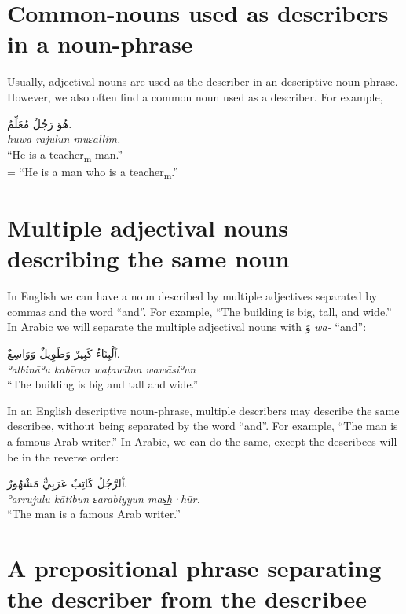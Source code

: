 \documentclass[
  10pt,
]{book}
\begin{document}
\section{Common-nouns used as describers in a noun-phrase}\label{common-nouns-used-as-describers-in-a-noun-phrase}

Usually, adjectival nouns are used as the describer in an descriptive noun-phrase. However, we also often find a common noun used as a describer. For example,

\foreignlanguage{arabic}{هُوَ رَجُلٌ مُعَلِّمٌ.}\\
\emph{huwa rajulun muɛallim.}\\
\enquote{He is a teacher\textsubscript{m} man.}\\
= \enquote{He is a man who is a teacher\textsubscript{m}.}

\section{Multiple adjectival nouns describing the same noun}\label{multiple-adjectival-nouns-describing-the-same-noun}

In English we can have a noun described by multiple adjectives separated by commas and the word \enquote{and}. For example, \enquote{The building is big, tall, and wide.} In Arabic we will separate the multiple adjectival nouns with \foreignlanguage{arabic}{وَ} \emph{wa-} \enquote{and}:

\foreignlanguage{arabic}{ٱَلْبِنَاءُ کَبِيرٌ وَطَوِيلٌ وَوَاسِعٌ.}\\
\emph{ʾalbināʾu kabīrun waṭawīlun wawāsiʾun}\\
\enquote{The building is big and tall and wide.}

In an English descriptive noun-phrase, multiple describers may describe the same describee, without being separated by the word \enquote{and}. For example, \enquote{The man is a famous Arab writer.} In Arabic, we can do the same, except the describees will be in the reverse order:

\foreignlanguage{arabic}{ٱَلرَّجُلُ کَاتِبٌ عَرَبِيٌّ مَشْهُورٌ.}\\
\emph{ʾarrujulu kātibun ɛarabiyyun mas͟h·hūr.}\\
\enquote{The man is a famous Arab writer.}

\section{A prepositional phrase separating the describer from the describee}\label{a-prepositional-phrase-separating-the-describer-from-the-describee}
\end{document}
